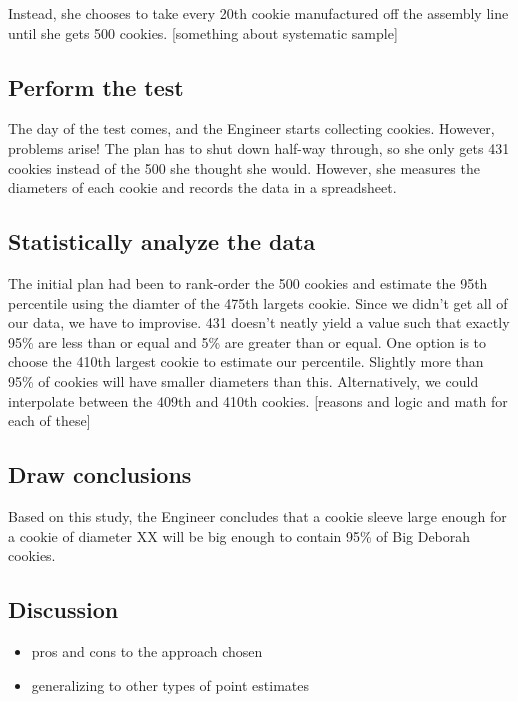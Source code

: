 \documentclass[]{book}
\providecommand{\tightlist}{%
  \setlength{\itemsep}{0pt}\setlength{\parskip}{0pt}}
\begin{document}
Instead, she chooses to take every 20th cookie manufactured off the assembly line until she gets 500 cookies. {[}something about systematic sample{]}

\hypertarget{perform-the-test}{%
\subsection{Perform the test}\label{perform-the-test}}

The day of the test comes, and the Engineer starts collecting cookies. However, problems arise! The plan has to shut down half-way through, so she only gets 431 cookies instead of the 500 she thought she would. However, she measures the diameters of each cookie and records the data in a spreadsheet.

\hypertarget{statistically-analyze-the-data-2}{%
\subsection{Statistically analyze the data}\label{statistically-analyze-the-data-2}}

The initial plan had been to rank-order the 500 cookies and estimate the 95th percentile using the diamter of the 475th largets cookie. Since we didn't get all of our data, we have to improvise. 431 doesn't neatly yield a value such that exactly 95\% are less than or equal and 5\% are greater than or equal. One option is to choose the 410th largest cookie to estimate our percentile. Slightly more than 95\% of cookies will have smaller diameters than this. Alternatively, we could interpolate between the 409th and 410th cookies. {[}reasons and logic and math for each of these{]}

\hypertarget{draw-conclusions-2}{%
\subsection{Draw conclusions}\label{draw-conclusions-2}}

Based on this study, the Engineer concludes that a cookie sleeve large enough for a cookie of diameter XX will be big enough to contain 95\% of Big Deborah cookies.

\hypertarget{discussion}{%
\subsection{Discussion}\label{discussion}}

\begin{itemize}
\tightlist
\item
  pros and cons to the approach chosen
\item
  generalizing to other types of point estimates
\end{itemize}
\end{document}

